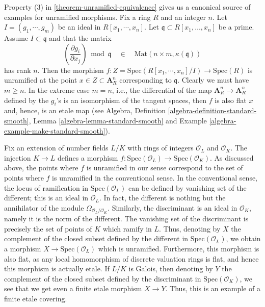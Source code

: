 \begin{example}
\label{example-standard-etale}
Property (3) in \ref{theorem-unramified-equivalence} gives us a canonical
source of examples for unramified morphisms.
Fix a ring $R$ and an integer $n$. Let $I = (g_1, \cdots, g_m)$ be an
ideal in $R[x_1, \cdots, x_n]$. Let $\mathfrak q \subset R[x_1, \ldots, x_n]$
be a prime. Assume $I \subset \mathfrak q$ and that the matrix
$$
\left(\frac{\partial g_i}{\partial x_j}\right) \bmod \mathfrak q
\quad\in\quad
\text{Mat}(n \times m, \kappa(\mathfrak q))
$$
has rank $n$. Then the morphism
$f : Z = \text{Spec}(R[x_1, \cdots, x_n]/I) \to \text{Spec}(R)$
is unramified at the point $x \in Z \subset \mathbf{A}^n_R$ corresponding
to $\mathfrak q$. Clearly we must have $m \geq n$.
In the extreme case $m = n$, i.e., the differential of the map
$\mathbf{A}^n_R \to \mathbf{A}^n_R$ defined by the $g_i$'s
is an isomorphism of the tangent spaces, then $f$ is also flat
$x$ and, hence, is an etale map (see Algebra,
Definition \ref{algebra-definition-standard-smooth},
Lemma \ref{algebra-lemma-standard-smooth} and
Example \ref{algebra-example-make-standard-smooth}).
\end{example}

\begin{example}
\label{example-number-theory-etale}
Fix an extension of number fields $L/K$ with rings of integers
$\mathcal{O}_L$ and $\mathcal{O}_K$. The injection $K \to L$ defines a
morphism $f : \text{Spec}(\mathcal{O}_L) \to \text{Spec}(\mathcal{O}_K)$.
As discussed above, the points where $f$ is unramified in our sense
correspond to the set of points where $f$ is unramified in the conventional
sense. In the conventional sense, the locus of ramification in
$\text{Spec}(\mathcal{O}_L)$ can be defined by vanishing set of the
different; this is an ideal in $\mathcal{O}_L$. In fact, the different is
nothing but the annihilator of the module
$\Omega_{\mathcal{O}_L/\mathcal{O}_K}$. Similarly, the
discriminant is an ideal in $\mathcal{O}_K$, namely it is the
norm of the different.
The vanishing set of the discriminant is precisely the set
of points of $K$ which ramify in $L$.
Thus, denoting by $X$ the complement of the closed subset
defined by the different in $\text{Spec}(\mathcal{O}_L)$,
we obtain a morphism $X \to \text{Spec}(\mathcal{O}_L)$ which is unramified.
Furthermore, this morphism is also flat, as any local homomorphism
of discrete valuation rings is flat, and hence this morphism is
actually etale. If $L/K$ is Galois, then denoting by
$Y$ the complement of the closed subset defined by the discriminant in
$\text{Spec}(\mathcal{O}_K)$, we see that we get even a
finite etale morphism $X \to Y$.
Thus, this is an example of a finite etale covering.
\end{example}






